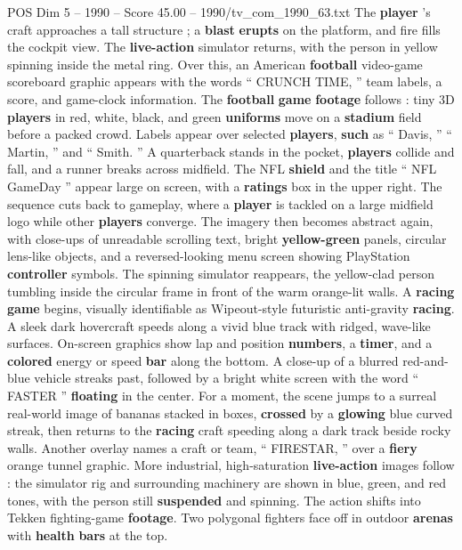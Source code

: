 \begin{textsample}{POS Dim 5 – 1990 – Score 45.00 – 1990/tv\_com\_1990\_63.txt}
The \textbf{player} ’s craft approaches a tall structure ; a \textbf{blast} \textbf{erupts} on the platform, and fire fills the cockpit view.
The \textbf{live-action} simulator returns, with the person in yellow spinning inside the metal ring.
Over this, an American \textbf{football} video-game scoreboard graphic appears with the words “ CRUNCH TIME, ” team labels, a score, and game-clock information.
The \textbf{football} \textbf{game} \textbf{footage} follows : tiny 3D \textbf{players} in red, white, black, and green \textbf{uniforms} move on a \textbf{stadium} field before a packed crowd.
Labels appear over selected \textbf{players}, \textbf{such} as “ Davis, ” “ Martin, ” and “ Smith. ” A quarterback stands in the pocket, \textbf{players} collide and fall, and a runner breaks across midfield.
The NFL \textbf{shield} and the title “ NFL GameDay ” appear large on screen, with a \textbf{ratings} box in the upper right.
The sequence cuts back to gameplay, where a \textbf{player} is tackled on a large midfield logo while other \textbf{players} converge.
The imagery then becomes abstract again, with close-ups of unreadable scrolling text, bright \textbf{yellow-green} panels, circular lens-like objects, and a reversed-looking menu screen showing PlayStation \textbf{controller} symbols.
The spinning simulator reappears, the yellow-clad person tumbling inside the circular frame in front of the warm orange-lit walls.
A \textbf{racing} \textbf{game} begins, visually identifiable as Wipeout-style futuristic anti-gravity \textbf{racing}.
A sleek dark hovercraft speeds along a vivid blue track with ridged, wave-like surfaces.
On-screen graphics show lap and position \textbf{numbers}, a \textbf{timer}, and a \textbf{colored} energy or speed \textbf{bar} along the bottom.
A close-up of a blurred red-and-blue vehicle streaks past, followed by a bright white screen with the word “ FASTER ” \textbf{floating} in the center.
For a moment, the scene jumps to a surreal real-world image of bananas stacked in boxes, \textbf{crossed} by a \textbf{glowing} blue curved streak, then returns to the \textbf{racing} craft speeding along a dark track beside rocky walls.
Another overlay names a craft or team, “ FIRESTAR, ” over a \textbf{fiery} orange tunnel graphic.
More industrial, high-saturation \textbf{live-action} images follow : the simulator rig and surrounding machinery are shown in blue, green, and red tones, with the person still \textbf{suspended} and spinning.
The action shifts into Tekken fighting-game \textbf{footage}.
Two polygonal fighters face off in outdoor \textbf{arenas} with \textbf{health} \textbf{bars} at the top.

\end{textsample}
